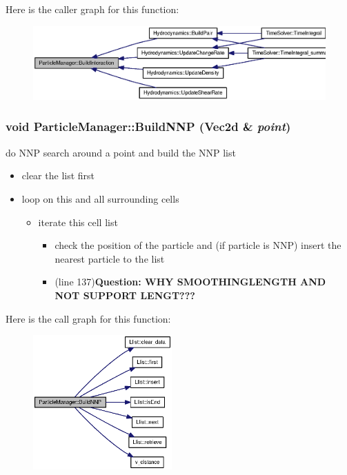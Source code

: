 Here is the caller graph for this function:\nopagebreak
\begin{figure}[H]
\begin{center}
\leavevmode
\includegraphics[width=350pt]{classParticleManager_8cc6658324694ad28d3c50bfc0cbd0f7_icgraph}
\end{center}
\end{figure}
\hypertarget{classParticleManager_4e0f9e5cb222739a83f0f80ee4ba265b}{
\subsubsection[{BuildNNP}]{\setlength{\rightskip}{0pt plus 5cm}void ParticleManager::BuildNNP (Vec2d \& {\em point})}}
\label{classParticleManager_4e0f9e5cb222739a83f0f80ee4ba265b}


do NNP search around a point and build the NNP list 



\begin{itemize}
\item clear the list first

\item loop on this and all surrounding cells

\begin{itemize}
\item iterate this cell list

\begin{itemize}
\item check the position of the particle and (if particle is NNP) insert the nearest particle to the list

\item (line 137){\bf Question: WHY SMOOTHINGLENGTH AND NOT SUPPORT LENGT???} \end{itemize}
\end{itemize}
\end{itemize}


Here is the call graph for this function:\nopagebreak
\begin{figure}[H]
\begin{center}
\leavevmode
\includegraphics[width=151pt]{classParticleManager_4e0f9e5cb222739a83f0f80ee4ba265b_cgraph}
\end{center}
\end{figure}


